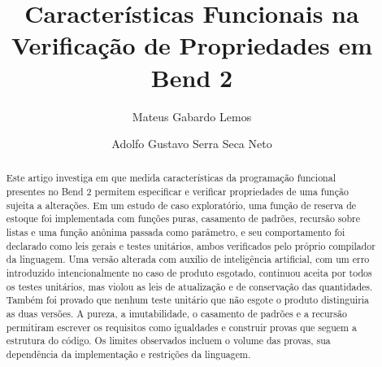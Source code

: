\documentclass[sigconf]{acmart}
\begin{document}
\title[Características Funcionais na Verificação de Propriedades em Bend 2]{Características Funcionais na Verificação de Propriedades em Bend 2}

\author{Mateus Gabardo Lemos}

\author{Adolfo Gustavo Serra Seca Neto}

\renewcommand{\shortauthors}{Lemos and Serra Seca Neto}

\begin{abstract}
Este artigo investiga em que medida características da programação funcional presentes no Bend 2 permitem especificar e verificar propriedades de uma função sujeita a alterações. Em um estudo de caso exploratório, uma função de reserva de estoque foi implementada com funções puras, casamento de padrões, recursão sobre listas e uma função anônima passada como parâmetro, e seu comportamento foi declarado como leis gerais e testes unitários, ambos verificados pelo próprio compilador da linguagem. Uma versão alterada com auxílio de inteligência artificial, com um erro introduzido intencionalmente no caso de produto esgotado, continuou aceita por todos os testes unitários, mas violou as leis de atualização e de conservação das quantidades. Também foi provado que nenhum teste unitário que não esgote o produto distinguiria as duas versões. A pureza, a imutabilidade, o casamento de padrões e a recursão permitiram escrever os requisitos como igualdades e construir provas que seguem a estrutura do código. Os limites observados incluem o volume das provas, sua dependência da implementação e restrições da linguagem.
\end{abstract}


\maketitle





\end{document}
